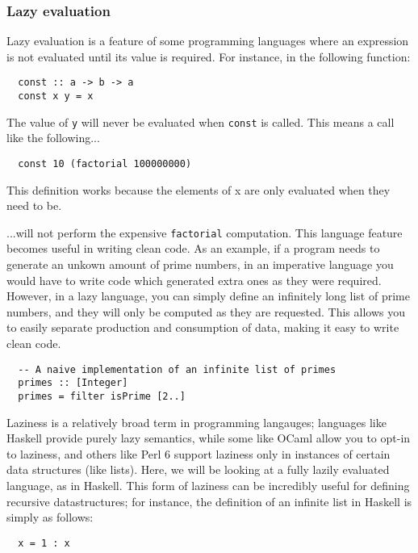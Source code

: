 \documentclass[9pt]{extarticle}
\begin{document}
\subsubsection{Lazy evaluation}

Lazy evaluation is a feature of some programming languages where an
expression is not evaluated until its value is required. For instance,
in the following function:

\begin{verbatim}
  const :: a -> b -> a
  const x y = x
\end{verbatim}

The value of \verb'y' will never be evaluated when \verb'const' is
called. This means a call like the following...

\begin{verbatim}
  const 10 (factorial 100000000)
\end{verbatim}

This definition works because the elements of x are only evaluated when they
need to be.

...will not perform the expensive \verb'factorial' computation. This
language feature becomes useful in writing clean code. As an example, if
a program needs to generate an unkown amount of prime numbers, in an
imperative language you would have to write code which generated extra
ones as they were required. However, in a lazy language, you can simply
define an infinitely long list of prime numbers, and they will only be
computed as they are requested. This allows you to easily separate
production and consumption of data, making it easy to write clean code.

\begin{verbatim}
  -- A naive implementation of an infinite list of primes
  primes :: [Integer]
  primes = filter isPrime [2..]
\end{verbatim}

Laziness is a relatively broad term in programming langauges; languages like
Haskell provide purely lazy semantics, while some like OCaml allow you to opt-in
to laziness, and others like Perl 6 support laziness only in instances of
certain data structures (like lists). Here, we will be looking at a fully lazily
evaluated language, as in Haskell. This form of laziness can be incredibly
useful for defining recursive datastructures; for instance, the definition of an
infinite list in Haskell is simply as follows:

\begin{verbatim}
  x = 1 : x
\end{verbatim}
\end{document}
